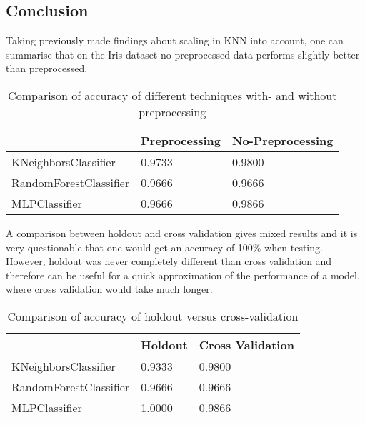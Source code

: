 
\subsection{Conclusion}

Taking previously made findings about scaling in KNN into account, one can summarise that on the Iris dataset no preprocessed data performs slightly better than preprocessed.

\begin{table}[h]
\begin{center}
\begin{tabular}{|l|l|l|}
\hline
                       & Preprocessing & No-Preprocessing \\ \hline
KNeighborsClassifier   & 0.9733        & 0.9800           \\ \hline
RandomForestClassifier & 0.9666        & 0.9666           \\ \hline
MLPClassifier          & 0.9666        & 0.9866           \\ \hline
\end{tabular}
\caption{Comparison of accuracy of different techniques with- and without preprocessing}
\end{center}
\end{table}

A comparison between holdout and cross validation gives mixed results and it is very questionable that one would get an accuracy of 100\% when testing. However, holdout was never completely different than cross validation and therefore can be useful for a quick approximation of the performance of a model, where cross validation would take much longer.

\begin{table}[h]
\begin{center}
\begin{tabular}{|l|l|l|}
\hline
                       & Holdout & Cross Validation \\ \hline
KNeighborsClassifier   & 0.9333  & 0.9800           \\ \hline
RandomForestClassifier & 0.9666  & 0.9666           \\ \hline
MLPClassifier          & 1.0000  & 0.9866           \\ \hline
\end{tabular}
\caption{Comparison of accuracy of holdout versus cross-validation}
\end{center}
\end{table}

